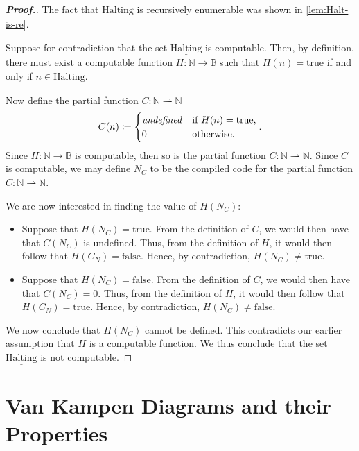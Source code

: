 \documentclass[11pt,a4paper,reqno]{amsart}
\theoremstyle{plain}
\theoremstyle{definition}
\theoremstyle{definition}
\newenvironment{myproof}{\begin{proof}[\normalfont\bfseries Proof.]}{\end{proof}}
\begin{document}
\begin{myproof}
	The fact that $\underline{\mathrm{Halting}}$ is recursively enumerable was shown in \cref{lem:Halt-is-re}.

	Suppose for contradiction that the set $\underline{\mathrm{Halting}}$ is computable.
	Then, by definition, there must exist a computable function $H\colon \mathbb N \to \mathbb B$ such that $H(n) =\mathrm{true}$ if and only if $n\in \underline{\mathrm{Halting}}$.

	Now define the partial function $C\colon \mathbb N \rightharpoonup \mathbb N$
	\[
		C(n)
		\coloneqq
		\begin{cases}
			\text{\textit{undefined}} & \text{if }H(n) = \mathrm{true}, \\
			0                         & \text{otherwise}.
		\end{cases}.
	\]
	Since $H\colon \mathbb N \to \mathbb B$ is computable, then so is the partial function $C\colon \mathbb N\rightharpoonup \mathbb N$.
	Since $C$ is computable, we may define $N_{C}$ to be the compiled code for the partial function $C\colon \mathbb N \rightharpoonup \mathbb N$.

	We are now interested in finding the value of $H(N_C)$:
	\begin{itemize}
		\item
		      Suppose that $H(N_C) = \mathrm{true}$.
		      From the definition of $C$, we would then have that $C(N_C)$ is undefined.
		      Thus, from the definition of $H$, it would then follow that $H(C_N) = \mathrm{false}$.
		      Hence, by contradiction, $H(N_C) \neq \mathrm{true}$.

		\item
		      Suppose that $H(N_C) = \mathrm{false}$.
		      From the definition of $C$, we would then have that $C(N_C) = 0$.
		      Thus, from the definition of $H$, it would then follow that $H(C_N) = \mathrm{true}$.
		      Hence, by contradiction, $H(N_C) \neq \mathrm{false}$.
	\end{itemize}
	We now conclude that $H(N_C)$ cannot be defined.
	This contradicts our earlier assumption that $H$ is a computable function.
	We thus conclude that the set $\underline{\mathrm{Halting}}$ is not computable.
\end{myproof}

\section{Van Kampen Diagrams and their Properties}
\end{document}
